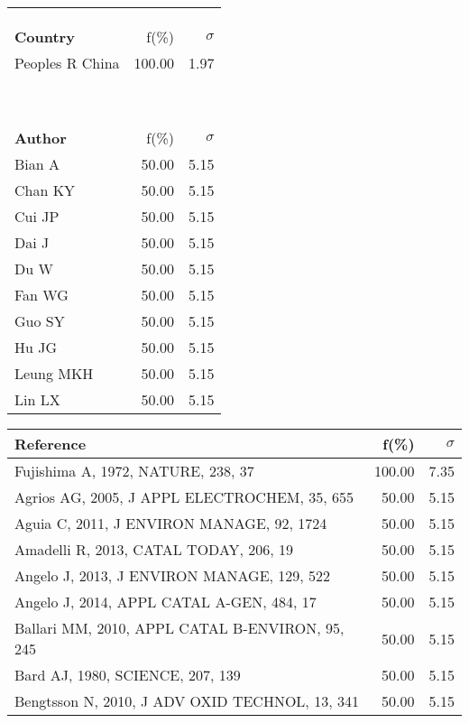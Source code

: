 \documentclass[a4paper,11pt]{report}
\begin{document}
\begin{landscape}
\begin{table}[!ht]
{\begin{tabular}{|p{5cm} r r|}
 &  & \\
 &  & \\
 &  & \\
\hline
{\bf Country }& f(\%) & $\sigma$\\
\hline
Peoples R China & 100.00 & 1.97\\
 &  & \\
 &  & \\
 &  & \\
 &  & \\
 &  & \\
 &  & \\
 &  & \\
 &  & \\
 &  & \\
\hline
{\bf Author }& f(\%) & $\sigma$\\
\hline
Bian A & 50.00 & 5.15\\
Chan KY & 50.00 & 5.15\\
Cui JP & 50.00 & 5.15\\
Dai J & 50.00 & 5.15\\
Du W & 50.00 & 5.15\\
Fan WG & 50.00 & 5.15\\
Guo SY & 50.00 & 5.15\\
Hu JG & 50.00 & 5.15\\
Leung MKH & 50.00 & 5.15\\
Lin LX & 50.00 & 5.15\\
\hline
\end{tabular}
}
{\scriptsize\begin{tabular}{|p{8cm} r r|}
\hline
{\bf Reference }& f(\%) & $\sigma$\\
\hline
Fujishima A, 1972, NATURE, 238, 37 & 100.00 & 7.35\\
Agrios AG, 2005, J APPL ELECTROCHEM, 35, 655 & 50.00 & 5.15\\
Aguia C, 2011, J ENVIRON MANAGE, 92, 1724 & 50.00 & 5.15\\
Amadelli R, 2013, CATAL TODAY, 206, 19 & 50.00 & 5.15\\
Angelo J, 2013, J ENVIRON MANAGE, 129, 522 & 50.00 & 5.15\\
Angelo J, 2014, APPL CATAL A-GEN, 484, 17 & 50.00 & 5.15\\
Ballari MM, 2010, APPL CATAL B-ENVIRON, 95, 245 & 50.00 & 5.15\\
Bard AJ, 1980, SCIENCE, 207, 139 & 50.00 & 5.15\\
Bengtsson N, 2010, J ADV OXID TECHNOL, 13, 341 & 50.00 & 5.15\\

\end{tabular}}
\end{table}
\end{landscape}
\end{document}
